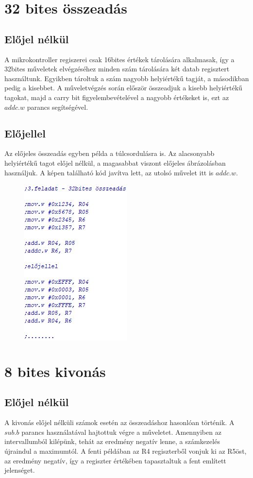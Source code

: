 \documentclass[10pt, conference,a4paper]{ITKproc}
\begin{document}
\section{32 bites összeadás}
\subsection{Előjel nélkül}
A mikrokontroller regiszerei csak 16bites értékek tárolására alkalmasak, így a 32bites műveletek elvégzéséhez minden szám tárolására két datab regisztert használtunk. Egyikben tároltuk a szám nagyobb helyiértékű tagját, a másodikban pedig a kisebbet. A műveletvégzés során először összeadjuk a kisebb helyiértékű tagokat, majd a carry bit figyelembevételével a nagyobb értékeket is, ezt az $addc.w$ parancs segítségével. 
\subsection{Előjellel}
Az előjeles összeadás egyben példa a túlcsordulásra is. Az alacsonyabb helyiértékű tagot előjel nélkül, a magasabbat viszont előjeles ábrázolásban használjuk. A képen található kód javítva lett, az utolsó művelet itt is $addc.w$. 

\begin{figure}[h]
\includegraphics[scale=0.5]{3feladat}
\centering

\end{figure}

\section{8 bites kivonás}
\subsection{Előjel nélkül}
A kivonás előjel nélküli számok esetén az összeadáshoz hasonlóan történik. A $sub.b$ parancs használatával hajtottuk végre a műveletet. Amennyiben az intervallumból kilépünk, tehát az eredmény negatív lenne, a számkezelés újraindul a maximumtól. A fenti példában az R4 regiszterből vonjuk ki az R5öst, az eredmény negatív, így a regiszter értékében tapasztaltuk a fent említett jelenséget. 
\end{document}
